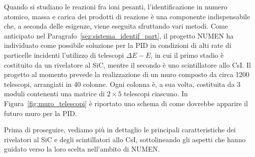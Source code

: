 




Quando si studiano le reazioni fra ioni pesanti, l'identificazione in numero atomico, massa e carica dei prodotti di reazione è una componente indispensabile che, a seconda delle esigenze, viene eseguita sfruttando vari metodi.
Come anticipato nel Paragrafo~\ref{sez:sistema_identif_part}, il progetto NUMEN ha individuato come possibile soluzione per la PID in condizioni di alti rate di particelle incidenti l'utilizzo di telescopi $\Delta E - E$, in cui il primo stadio è costituito da un rivelatore al SiC, mentre il secondo è uno scintillatore allo CsI.
Il progetto al momento prevede la realizzazione di un muro composto da circa 1200 telescopi, arrangiati in 40 colonne.
Ogni colonna è, a sua volta, costituita da 3 moduli contenenti una matrice di $2 \times 5$ telescopi ciascuno.
In Figura~\ref{fig:muro_telescopi} è riportato uno schema di come dovrebbe apparire il futuro muro per la PID.

Prima di proseguire, vediamo più in dettaglio le principali caratteristiche dei rivelatori al SiC e degli scintillatori allo CsI, sottolineando gli aspetti che  hanno guidato verso la loro scelta nell'ambito di NUMEN.


